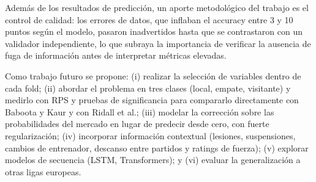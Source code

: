 \documentclass{ieeeaccess}
\begin{document}
Además de los resultados de predicción, un aporte metodológico del trabajo es el control de calidad: los errores de datos, que inflaban el accuracy entre 3 y 10 puntos según el modelo, pasaron inadvertidos hasta que se contrastaron con un validador independiente, lo que subraya la importancia de verificar la ausencia de fuga de información antes de interpretar métricas elevadas.

Como trabajo futuro se propone: (i) realizar la selección de variables dentro de cada fold; (ii) abordar el problema en tres clases (local, empate, visitante) y medirlo con RPS y pruebas de significancia para compararlo directamente con Baboota y Kaur y con Ridall et al.; (iii) modelar la corrección sobre las probabilidades del mercado en lugar de predecir desde cero, con fuerte regularización; (iv) incorporar información contextual (lesiones, suspensiones, cambios de entrenador, descanso entre partidos y ratings de fuerza); (v) explorar modelos de secuencia (LSTM, Transformers); y (vi) evaluar la generalización a otras ligas europeas.




\EOD
\end{document}
